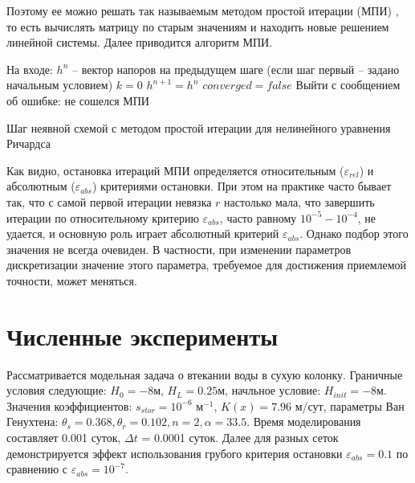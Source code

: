 \documentclass[a4paper,12pt]{article}
\begin{document}
 Поэтому ее можно решать так называемым методом простой итерации (МПИ) \cite{Celia1990}, то есть вычислять матрицу по старым значениям и находить новые решением линейной системы. Далее приводится алгоритм МПИ.
 
 	\begin{algorithm}[H]\label{alg:time_step_richards}
 	\SetAlgoLined
 	На входе: $h^n$ -- вектор напоров на предыдущем шаге (если шаг первый -- задано начальным условием)\;
 	$k = 0$\;
 	$h^{n+1} = h^n$\;
 	$converged = false$\;
 	{
 		Выйти с сообщением об ошибке: не сошелся МПИ\;
 	}
 	\caption{Шаг неявной схемой с методом простой итерации для нелинейного уравнения Ричардса}
 \end{algorithm}
 
 Как видно, остановка итераций МПИ определяется относительным ($\varepsilon_{rel}$) и абсолютным ($\varepsilon_{abs}$) критериями остановки. При этом на практике часто бывает так, что с самой первой итерации невязка $r$ настолько мала, что завершить итерации по относительному критерию $\varepsilon_{abs}$, часто равному $10^{-5} - 10^{-4}$, не удается, и основную роль играет абсолютный критерий $\varepsilon_{abs}$. Однако подбор этого значения не всегда очевиден. В частности, при изменении параметров дискретизации значение этого параметра, требуемое для достижения приемлемой точности, может меняться. 


\section{Численные эксперименты}
Рассматривается модельная задача о втекании воды в сухую колонку. Граничные условия следующие: $H_0 = -8 м$, $H_L = 0.25 м$, начльное условие: $H_{init} = -8 м$. Значения коэффициентов: $s_{stor} = 10^{-6}$ м$^{-1}$, $K(x) = 7.96$ м/сут, параметры Ван Генухтена: $\theta_s = 0.368, \theta_r = 0.102, n = 2, \alpha = 33.5$. Время моделирования составляет 0.001 суток, $\Delta t$ = 0.0001 суток. Далее для разных сеток демонстрируется эффект использования грубого критерия остановки $\varepsilon_{abs} = 0.1$ по сравнению с $\varepsilon_{abs} = 10^{-7}$. 
\end{document}
